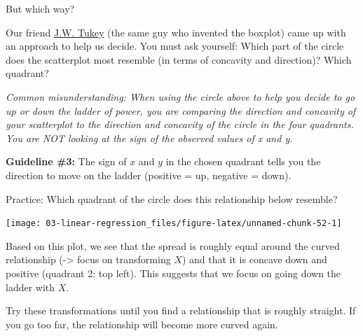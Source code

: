 \documentclass[
]{book}
\newenvironment{Shaded}{\begin{snugshade}}{\end{snugshade}}
\newcommand{\DataTypeTok}[1]{\textcolor[rgb]{0.13,0.29,0.53}{#1}}
\newcommand{\DecValTok}[1]{\textcolor[rgb]{0.00,0.00,0.81}{#1}}
\newcommand{\KeywordTok}[1]{\textcolor[rgb]{0.13,0.29,0.53}{\textbf{#1}}}
\newcommand{\NormalTok}[1]{#1}
\newcommand{\OperatorTok}[1]{\textcolor[rgb]{0.81,0.36,0.00}{\textbf{#1}}}
\newcommand{\StringTok}[1]{\textcolor[rgb]{0.31,0.60,0.02}{#1}}
\begin{document}
But which way?

Our friend \href{https://en.wikipedia.org/wiki/John_Tukey}{J.W. Tukey} (the same guy who invented the boxplot) came up with an approach to help us decide. You must ask yourself: Which part of the circle does the scatterplot most resemble (in terms of concavity and direction)? Which quadrant?

\emph{Common misunderstanding: When using the circle above to help you decide to go up or down the ladder of power, you are comparing the direction and concavity of your scatterplot to the direction and concavity of the circle in the four quadrants. You are NOT looking at the sign of the observed values of x and y.}

\textbf{Guideline \#3:} The sign of \(x\) and \(y\) in the chosen quadrant tells you the direction to move on the ladder (positive = up, negative = down).

Practice: Which quadrant of the circle does this relationship below resemble?

\begin{Shaded}
\end{Shaded}

\begin{center}\texttt{[image: 03-linear-regression\_files/figure-latex/unnamed-chunk-52-1]} \end{center}

Based on this plot, we see that the spread is roughly equal around the curved relationship (-\textgreater{} focus on transforming \(X\)) and that it is concave down and positive (quadrant 2: top left). This suggests that we focus on going down the ladder with \(X\).

Try these transformations until you find a relationship that is roughly straight. If you go too far, the relationship will become more curved again.
\end{document}
